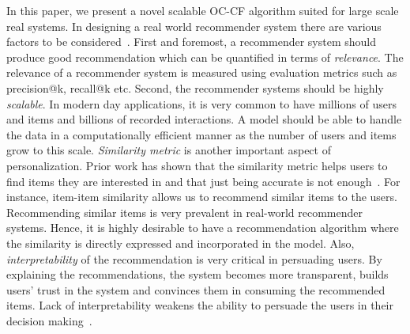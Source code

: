 In this paper, we present a novel scalable OC-CF algorithm suited for large scale real systems. 
In designing a real world recommender system there are various factors to be 
considered~\citep{adomavicius2005toward, ricci2011introduction}. First and foremost, a recommender system should  produce good recommendation which can be quantified in terms of \textsl{relevance}. The relevance of a recommender system is measured using evaluation metrics such as \textsf{precision@k}, \textsf{recall@k} etc. Second, the recommender systems should be highly \textsl{scalable}. In modern day applications, it is very common to have millions of users and items and billions of recorded interactions. A model should be able to handle the data in a computationally efficient manner as the number of users and items grow to this scale. \textsl{Similarity metric} is another important aspect of personalization. Prior work has shown that the similarity metric helps users to find items they are interested in and that just being accurate is not enough~\citep{mcnee2006being}.  For instance, item-item similarity allows us to recommend similar items to the users. Recommending similar items is very prevalent in  real-world recommender systems. Hence, it is highly desirable to have a recommendation algorithm where the similarity is directly expressed and incorporated in the model. Also, \textsl{interpretability} of the recommendation is very critical in persuading users. By explaining the recommendations, the system becomes more transparent, builds users' trust in the system and convinces them in consuming the recommended items. Lack of interpretability weakens the ability to persuade the users in their decision making~\citep{explainabiltyVIG2009}.

